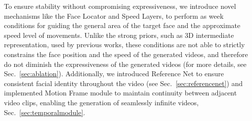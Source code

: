 \documentclass[runningheads]{llncs}
\begin{document}
To ensure stability without compromising expressiveness, we introduce novel mechanisms like the Face Locator and Speed Layers, to perform as week conditions for guiding the general area of the target face and the approximate speed level of movements. 
Unlike the strong priors, such as 3D intermediate representation, used by previous works, these conditions are not able to strictly constrains the face position and the speed of the generated videos, and therefore do not diminish the expressiveness of the generated videos (for more details, see Sec.~\ref{sec:ablation}). Additionally, we introduced Reference Net\cite{animate_anyone} to ensure consistent facial identity throughout the video (see Sec.~\ref{sec:referencenet}) and implemented Motion Frame module to maintain continuity between adjacent video clips, enabling the generation of seamlessly infinite videos, Sec.~\ref{sec:temporalmodule}.
\end{document}
